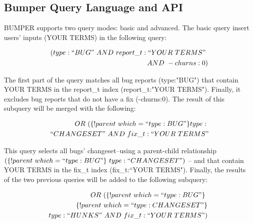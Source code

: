 \documentclass[conference]{IEEEtran}
\begin{document}
\subsection{Bumper Query Language and API}
\label{sub:Bumper Query Language and API}

BUMPER supports two query modes: basic and advanced.
The basic query insert users' inputs (YOUR TERMS) in the
following query:

\begin{equation*}
\begin{split}
~~(type:``BUG"~AND~report\_t:``YOUR~TERMS"~\\
~~AND~-churns:0)
\end{split}
\end{equation*}

\vspace{0.1cm}

The first part of the query matches all bug reports
(type:"BUG") that contain YOUR TERMS in the report\_t index
(report\_t:"YOUR TERMS").
Finally, it excludes bug reports that
do not have a fix (-churns:0).
The result of this subquery will be
merged with the following:

\begin{equation*}
\begin{split}
~~OR~(\{!parent~which=``type:BUG"\}type:~\\
~~``CHANGESET"~AND~fix\_t:``YOUR~TERMS"
\end{split}
\end{equation*}

\vspace{0.1cm}

This query selects all bugs' changeset--using a parent-child
relationship $(\{!parent~which=``type:BUG"\}~type:
  ``CHANGESET")$ -- and that contain YOUR TERMS in the fix\_t
  index (fix\_t:``YOUR TERMS").
Finally, the results of the two
previous queries will be added to the following subquery:

\begin{equation*}
\begin{split}
  OR~(\{!parent~which=``type:BUG"\}\ \\
~\{!parent~which=``type:CHANGESET"\}\\
~type:``HUNKS"~AND~fix\_t:``YOUR~TERMS")
\end{split}
\end{equation*}

\vspace{0.1cm}
\end{document}
